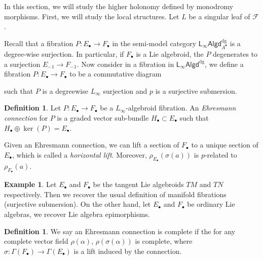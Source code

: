 \documentclass[12pt]{amsart}
\theoremstyle{definition}
\newtheorem{example}[thm]{Example}
\newtheorem{defn}[thm]{Definition}
\theoremstyle{remark}
\numberwithin{equation}{section}
\newcommand{\CF}{{\mathcal F}}
\newcommand{\1}{{\mathbb{1}}}
\newcommand{\lalgd}{\mathsf{L_{\infty}Algd}^{\operatorname{dg}}}
\begin{document}
In this section, we will study the higher holonomy defined by monodromy morphisms. First, we will study the local structures. Let $L$ be a singular leaf of $\CF$. 

Recall that a fibration $P: E_{\bullet} \to F_{\bullet}$ in the semi-model category $\lalgd_{A^{\bullet}}$ is a degree-wise surjection. In particular, if $F_{\bullet}$ is a Lie algebroid, the $P$ degenerates to a surjection $E_{-1} \to F_{-1}$. Now consider in a fibration in $\lalgd$, we define a fibration $P: E_{\bullet} \to F_{\bullet}$ to be a commutative diagram 

\begin{center}
\end{center}
such that $P$ is a degreewise $L_{\infty}$ surjection and $p$ is a surjective submersion. 

\begin{defn}
    Let $P: E_{\bullet} \to F_{\bullet}$ be a $L_{\infty}$-algebroid fibration. An {\it Ehresmann connection} for $P$ is a graded vector sub-bundle $H_{\bullet} \subset E_{\bullet}$ such that $H_{\bullet} \oplus \ker(P) = E_{\bullet}$. 
\end{defn}
Given an Ehresmann connection, we can lift a section of $F_{\bullet}$ to a unique section of $E_{\bullet}$, which is called a {\it horizontal lift}. Moreover,  $\rho_{E_{\bullet}}(\sigma(a))$ is $p$-related to $\rho_{F_{\bullet}}(a)$.


\begin{example}
    Let $E_{\bullet}$ and $F_{\bullet}$ be the tangent Lie algebroids $TM$ and $TN$ respectively. Then we recover the usual definition of manifold fibrations (surjective submersion). On the other hand, let $E_{\bullet}$ and $F_{\bullet}$ be ordinary Lie algebras, we recover Lie algebra epimorphisms.
\end{example}


\begin{defn}
We say an Ehresmann connection is complete if the for any complete vector field $\rho(\alpha)$, $\rho(\sigma(\alpha))$ is complete, where $\sigma: \Gamma(F_{\bullet}) \to \Gamma(E_{\bullet})$ is a lift induced by the connection. 
\end{defn}
\end{document}
